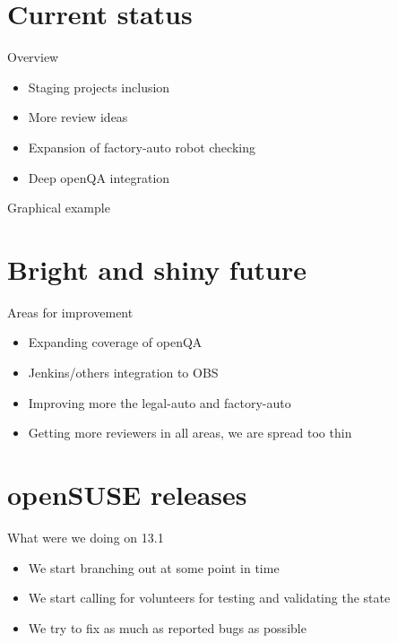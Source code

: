 \documentclass{beamer}
\begin{document}
\section{Current status}

\begin{frame}[t]{Overview}
	\begin{itemize}
	\item Staging projects inclusion
	\item More review ideas
	\item Expansion of factory-auto robot checking
	\item Deep openQA integration
	\end{itemize}
\end{frame}

\begin{frame}{Graphical example}
\end{frame}

\section{Bright and shiny future}

\begin{frame}[t]{Areas for improvement}
	\begin{itemize}
	\item Expanding coverage of openQA
	\item Jenkins/others integration to OBS
	\item Improving more the legal-auto and factory-auto
	\item Getting more reviewers in all areas, we are spread too thin
	\end{itemize}
\end{frame}


\section{openSUSE releases}

\begin{frame}[t]{What were we doing on 13.1}
	\begin{itemize}
	\item We start branching out at some point in time
	\item We start calling for volunteers for testing and validating the state
	\item We try to fix as much as reported bugs as possible
	\end{itemize}
\end{frame}
\end{document}
